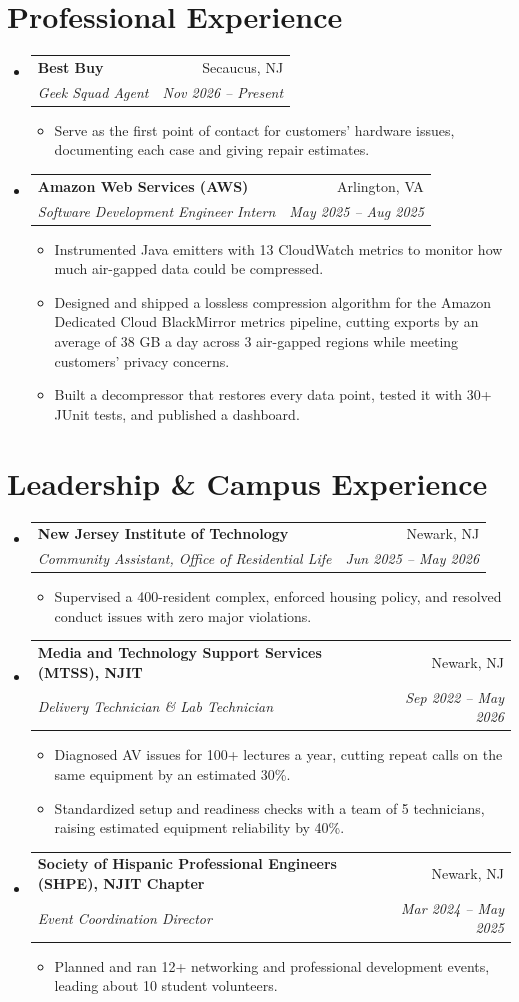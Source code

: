 \documentclass[letterpaper,11pt]{article}
\makeatletter
\newcommand{\resumeItem}[1]{\item\small{#1}}
\newcommand{\resumeSubheading}[4]{
  \vspace{-2pt}\item
    \begin{tabular*}{0.97\textwidth}[t]{l@{\extracolsep{\fill}}r}
      \textbf{#1} & #2 \\
      \textit{\small#3} & \textit{\small #4} \\
    \end{tabular*}\vspace{-7pt}
}
\newcommand{\resumeSubHeadingListStart}{\begin{itemize}[leftmargin=0.15in, label={}, itemsep=1pt, parsep=0pt, topsep=2pt]}
\newcommand{\resumeSubHeadingListEnd}{\end{itemize}}
\newcommand{\resumeItemListStart}{\begin{itemize}[topsep=6pt,itemsep=0pt,parsep=0pt,partopsep=0pt]}
\newcommand{\resumeItemListEnd}{\end{itemize}\vspace{-5pt}}
\makeatother
\begin{document}
\section{Professional Experience}
  \resumeSubHeadingListStart
    \resumeSubheading
      {Best Buy}{Secaucus, NJ}
      {Geek Squad Agent}{Nov 2026 -- Present}
      \resumeItemListStart
        \resumeItem{Serve as the first point of contact for customers' hardware issues, documenting each case and giving repair estimates.}
      \resumeItemListEnd
    \resumeSubheading
      {Amazon Web Services (AWS)}{Arlington, VA}
      {Software Development Engineer Intern}{May 2025 -- Aug 2025}
      \resumeItemListStart
        \resumeItem{Instrumented Java emitters with 13 CloudWatch metrics to monitor how much air-gapped data could be compressed.}
        \resumeItem{Designed and shipped a lossless compression algorithm for the Amazon Dedicated Cloud BlackMirror metrics pipeline, cutting exports by an average of 38 GB a day across 3 air-gapped regions while meeting customers' privacy concerns.}
        \resumeItem{Built a decompressor that restores every data point, tested it with 30+ JUnit tests, and published a dashboard.}
      \resumeItemListEnd
  \resumeSubHeadingListEnd

\section{Leadership \& Campus Experience}
  \resumeSubHeadingListStart
    \resumeSubheading
      {New Jersey Institute of Technology}{Newark, NJ}
      {Community Assistant, Office of Residential Life}{Jun 2025 -- May 2026}
      \resumeItemListStart
        \resumeItem{Supervised a 400-resident complex, enforced housing policy, and resolved conduct issues with zero major violations.}
      \resumeItemListEnd
    \resumeSubheading
      {Media and Technology Support Services (MTSS), NJIT}{Newark, NJ}
      {Delivery Technician \& Lab Technician}{Sep 2022 -- May 2026}
      \resumeItemListStart
        \resumeItem{Diagnosed AV issues for 100+ lectures a year, cutting repeat calls on the same equipment by an estimated 30\%.}
        \resumeItem{Standardized setup and readiness checks with a team of 5 technicians, raising estimated equipment reliability by 40\%.}
      \resumeItemListEnd
    \resumeSubheading
      {Society of Hispanic Professional Engineers (SHPE), NJIT Chapter}{Newark, NJ}
      {Event Coordination Director}{Mar 2024 -- May 2025}
      \resumeItemListStart
        \resumeItem{Planned and ran 12+ networking and professional development events, leading about 10 student volunteers.}
      \resumeItemListEnd
  \resumeSubHeadingListEnd
\end{document}
